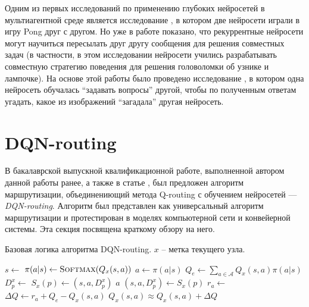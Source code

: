 \documentclass[specification,annotation,times]{itmo-student-thesis}
\theoremstyle{definition}
\begin{document}
Одним из первых исследований по применению глубоких нейросетей в мультиагентной
среде является исследование \cite{tampuu2017multiagent}, в котором две нейросети
играли в игру Pong друг с другом. Но уже в работе \cite{foerster2016learning}
показано, что рекуррентные нейросети могут научиться пересылать друг другу сообщения для решения
совместных задач (в частности, в этом исследовании нейросети учились
разрабатывать совместную стратегию поведения для решения головоломки об узнике и
лампочке). На основе этой работы было проведено исследование
\cite{jorge2016learning}, в котором одна нейросеть обучалась
\enquote{задавать вопросы} другой, чтобы по полученным ответам угадать, какое из
изображений \enquote{загадала} другая нейросеть.

\section{DQN-routing}\label{overview:dqn-routing}

В бакалаврской выпускной квалификационной работе, выполненной автором данной
работы ранее, а также в статье \cite{mukhutdinov2019multi}, был
предложен алгоритм маршрутизации, объединениющий метода Q-routing с обучением
нейросетей --- \textit{DQN-routing}. Алгоритм был представлен как универсальный
алгоритм маршрутизации и протестирован в моделях компьютерной сети и конвейерной
системы. Эта секция посвящена краткому обзору на него.

\begin{algorithm}[!h]
\caption{Базовая логика алгоритма DQN-routing. $x$ -- метка текущего узла.}
\label{dqnr-pseudocode}
\begin{algorithmic}[1]
   
    \State $s \gets $ 
    \State $\pi(a | s) \gets \textsc{Softmax}(Q_x(s, a))$ 
    \State $a \gets \pi(a | s)$
    \State $Q_e \gets \sum\limits_{a \in \mathcal{A}} {Q_x(s, a) \pi(a | s)}$
    \State $D_p^x \gets $ 
    \State $S_x(p) \gets (s, a, D_p^x)$
    \State {}
    \State \Return $a$ 
  \EndFunction
  \Statex
    \State $(s, a, D_p^x) \gets S_x(p)$
    \State $r_a \gets $ 
    \State $\Delta Q \gets r_a + Q_e - Q_x(s, a)$
    \State $Q_x(s, a) \approx Q_x(s, a) + \Delta Q$ 
  \EndProcedure
\end{algorithmic}
\end{algorithm}
\end{document}
